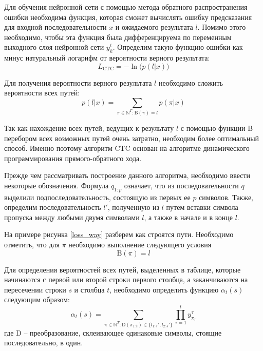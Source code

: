 Для обучения нейронной сети с помощью метода обратного распространения ошибки необходима функция, которая сможет вычислять ошибку предсказания для входной последовательности $x$ и ожидаемого результата $l$. Помимо этого необходимо, чтобы эта функция была дифференцируема по переменным выходного слоя нейронной сети $y_k^t$. Определим такую функцию ошибки как минус натуральный логарифм от вероятности верного результата:
\begin{equation}
    L_{\text{CTC}} = -\ln\bigl(p(l|x)\bigr)
\end{equation}

Для получения вероятности верного результата $l$ необходимо сложить вероятности всех путей:
\begin{equation}
    p(l|x) = \sum\limits_{\pi\in\mathbb{N}^T:\text{B}(\pi)=l} p(\pi|x)
\end{equation}

Так как нахождение всех путей, ведущих к результату $l$ с помощью функции B перебором всех возможных путей очень затратно, необходим более оптимальный способ. Именно поэтому алгоритм CTC основан на алгоритме динамического программирования прямого-обратного хода.

Прежде чем рассматривать построение данного алгоритма, необходимо ввести некоторые обозначения. Формула $q_{1:p}$  означает, что из последовательности $q$ выделили подпоследовательность, состоящую из первых ее $p$ символов.  Также, определим последовательность $l'$, полученную из $l$ путем вставки символа пропуска между любыми двумя символами $l$, а также в начале и в конце $l$.

На примере рисунка \ref{loss_way} разберем как строятся пути. Необходимо отметить, что для $π$ необходимо выполнение следующего условия
\begin{equation}
    \text{B}(\pi)=l
\end{equation}

Для определения вероятностей всех путей, выделенных в таблице, которые начинаются с первой или второй строки первого столбца, а заканчиваются на пересечении строки $s$ и столбца $t$, необходимо определить функцию  $\alpha_t(s)$ следующим образом:
\begin{equation}
    \alpha_t(s) = \sum\limits_{\pi\in\mathbb{N}^T:\text{D}(\pi_{1:t})\in\bigl\{l_{1:s}',l_{2:s}'\bigr\}}\prod\limits_{\tau=1}^t y_{\pi_{\tau}}^\tau
\end{equation}
где $\text{D}$ -- преобразование, склеивающее одинаковые символы, стоящие последовательно, в один. 

